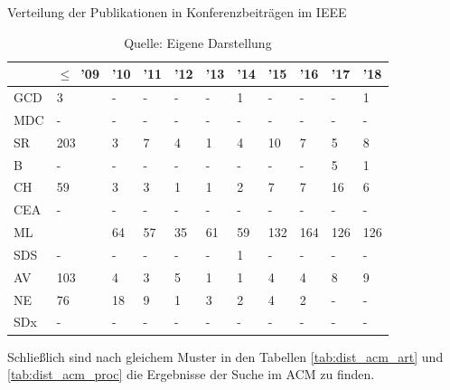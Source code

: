 \begin{table}
\caption{Verteilung der Publikationen in Konferenzbeiträgen im \glqq IEEE\grqq}
\centering
\label{tab:dist_ieee_proc}
\begin{tabularx}{\linewidth}{X|X|X|X|X|X|X|X|X|X|X}
	& $\leq$~'09 & '10 & '11 & '12 & '13 & '14 & '15 & '16 & '17 & '18 \\
	\hline
	GCD & 3 & - & - & - & - & 1 & - & - & - & 1 \\
	\hline
	MDC & - & - & - & - & - & - & - & - & - & - \\
	\hline
	SR & 203 & 3 & 7 & 4 & 1 & 4 & 10 & 7 & 5 & 8 \\
	\hline
	B & - & - & - & - & - & - & - & - & 5 & 1 \\
	\hline
	CH & 59 & 3 & 3 & 1 & 1 & 2 & 7 & 7 & 16 & 6 \\
	\hline
	CEA & - & - & - & - & - & - & - & - & - & - \\
	\hline
	ML & \numprint{2042} & 64 & 57 & 35 & 61 & 59 & 132 & 164 & 126 & 126 \\
	\hline
	SDS & - & - & - & - & - & 1 & - & - & - & - \\
	\hline
	AV & 103 & 4 & 3 & 5 & 1 & 1 & 4 & 4 & 8 & 9 \\
	\hline
	NE & 76 & 18 & 9 & 1 & 3 & 2 & 4 & 2 & - & - \\
	\hline
	SDx & - & - & - & - & - & - & - & - & - & - \\
\end{tabularx}
\caption*{Quelle: Eigene Darstellung}
\end{table}

Schließlich sind nach gleichem Muster in den Tabellen \ref{tab:dist_acm_art} und \ref{tab:dist_acm_proc} die Ergebnisse der Suche im ACM zu finden.

